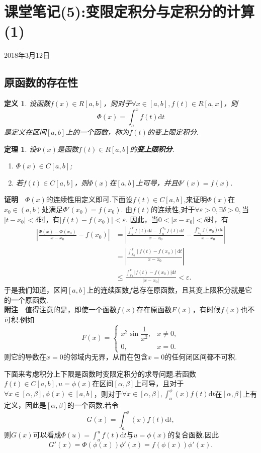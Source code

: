 \documentclass[UTF8]{article}
\newcommand{\zm}{\textbf{证明}$\quad$}
\newcommand{\fz}{\textbf{附注}$\quad$}
\newtheorem{thm}{\hspace{2em}定理}[section]
\newtheorem{dfn}{\hspace{2em}定义}[section]
\begin{document}
\section{课堂笔记(5):变限定积分与定积分的计算(1)}
\begin{center}
  2018年3月12日
\end{center}
\subsection{原函数的存在性}
\begin{dfn}
  设函数$f(x)\in R[a,b]$，则对于$\forall x\in[a,b],f(t)\in R[a,x]$，则
  $$\varPhi(x)=\int_a^xf(t)\mathrm{d}t$$是定义在区间$[a,b]$上的一个函数，称为$f(t)$的变上限定积分.
\end{dfn}
\begin{thm}
  设$\varPhi(x)$是函数$f(t)\in R[a,b]$的\textbf{变上限积分}.
  \begin{enumerate}
    \item $\varPhi(x)\in C[a,b]$;
    \item 若$f(t)\in C[a,b]$，则$\varPhi(x)$在$[a,b]$上可导，并且$\varPhi'(x)=f(x)$.
  \end{enumerate}
\end{thm}
\zm $\varPhi(x)$的连续性用定义即可.下面设$f(t)\in C[a,b]$,来证明$\varPhi(x)$在$x_0\in(a,b)$处满足$\varPhi'(x_0)=f(x_0).$
由$f(t)$的连续性,对于$\forall\varepsilon>0,\exists\delta>0,$当$|t-x_0|<\delta$时，有$|f(t)-f(x_0)|<\varepsilon.$
因此，当$0<|x-x_0|<\delta$时，有
\begin{align*}
  \left|\frac{\varPhi(x)-\varPhi(x_0)}{x-x_0}-f(x_0)\right|&=\left|
  \frac{\int_a^xf(t)\mathrm{d}t-\int_a^{x_0}f(t)\mathrm{d}t}{x-x_0}-\frac{\int_{x_0}^xf(x_0)\mathrm{d}t}{x-x_0}\right|\\
  &=\left|\frac{\int_{x_0}^x[f(t)-f(x_0)]\mathrm{d}t}{x-x_0}\right|\\
  &\le\frac{\int_{x_0}^x|f(t)-f(x_0)|\mathrm{d}t}{|x-x_0|}<\varepsilon.
\end{align*}
于是我们知道，区间$[a,b]$上的连续函数$f$总存在原函数，且其变上限积分就是它的一个原函数.\\
\fz 值得注意的是，即使一个函数$f(x)$存在原函数$F(x)$，有时候$f(x)$也不可积.例如
\[
F(x)=
\begin{cases}
  x^2\sin\dfrac{1}{x^2},&x\ne0,\\
  0,&x=0.
\end{cases}
\]
则它的导数在$x=0$的邻域内无界，从而在包含$x=0$的任何闭区间都不可积.

下面来考虑积分上下限是函数时变限定积分的求导问题.若函数$f(t)\in C[a,b],u=\phi(x)$在区间$[\alpha,\beta]$上可导，且对于
$\forall x\in[\alpha,\beta],\phi(x)\in[a,b]$，则对于$\forall x\in[\alpha,\beta],\displaystyle\int_a^\phi(x)f(t)
\mathrm{d}t$在$[\alpha,\beta]$上有定义，因此是$[\alpha,\beta]$的一个函数.若令
$$G(x)=\int_a^\phi(x)f(t)\mathrm{d}t,$$则$G(x)$可以看成$\varPhi(u)=\int_a^uf(t)\mathrm{d}t$与$u=\phi(x)$的复合函数.因此
$$G'(x)=\varPhi(\phi(x))\phi'(x)=f(\phi(x))\phi'(x).$$
\end{document}
